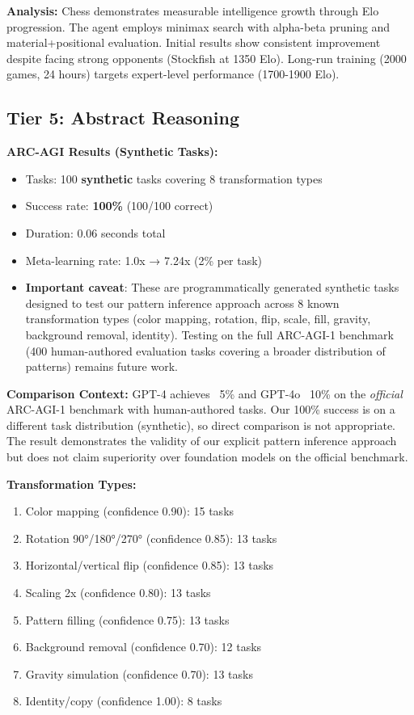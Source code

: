 \documentclass[11pt,letterpaper]{article}
\begin{document}
\textbf{Analysis:} Chess demonstrates measurable intelligence growth through Elo progression. The agent employs minimax search with alpha-beta pruning and material+positional evaluation. Initial results show consistent improvement despite facing strong opponents (Stockfish at 1350 Elo). Long-run training (2000 games, 24 hours) targets expert-level performance (1700-1900 Elo).

\subsection{Tier 5: Abstract Reasoning}

\textbf{ARC-AGI Results (Synthetic Tasks):}
\begin{itemize}
\item Tasks: 100 \textbf{synthetic} tasks covering 8 transformation types
\item Success rate: \textbf{100\%} (100/100 correct)
\item Duration: 0.06 seconds total
\item Meta-learning rate: 1.0x → 7.24x (2\% per task)
\item \textbf{Important caveat}: These are programmatically generated synthetic tasks designed to test our pattern inference approach across 8 known transformation types (color mapping, rotation, flip, scale, fill, gravity, background removal, identity). Testing on the full ARC-AGI-1 benchmark (400 human-authored evaluation tasks covering a broader distribution of patterns) remains future work.
\end{itemize}

\textbf{Comparison Context:} GPT-4 achieves ~5\% and GPT-4o ~10\% on the \textit{official} ARC-AGI-1 benchmark with human-authored tasks. Our 100\% success is on a different task distribution (synthetic), so direct comparison is not appropriate. The result demonstrates the validity of our explicit pattern inference approach but does not claim superiority over foundation models on the official benchmark.

\textbf{Transformation Types:}
\begin{enumerate}
\item Color mapping (confidence 0.90): 15 tasks
\item Rotation 90°/180°/270° (confidence 0.85): 13 tasks
\item Horizontal/vertical flip (confidence 0.85): 13 tasks
\item Scaling 2x (confidence 0.80): 13 tasks
\item Pattern filling (confidence 0.75): 13 tasks
\item Background removal (confidence 0.70): 12 tasks
\item Gravity simulation (confidence 0.70): 13 tasks
\item Identity/copy (confidence 1.00): 8 tasks
\end{enumerate}
\end{document}
